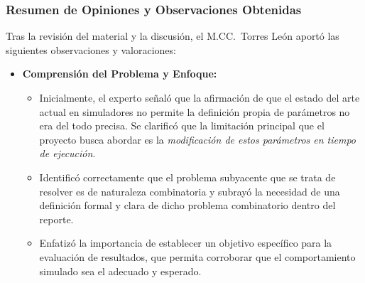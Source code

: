 \subsubsection{Resumen de Opiniones y Observaciones Obtenidas}

Tras la revisión del material y la discusión, el M.CC.\ Torres León aportó las siguientes observaciones y valoraciones:

\begin{itemize}
    \item \textbf{Comprensión del Problema y Enfoque:}
    \begin{itemize}
        \item Inicialmente, el experto señaló que la afirmación de que el estado del arte actual en simuladores no permite la definición propia de parámetros no era del todo precisa. Se clarificó que la limitación principal que el proyecto busca abordar es la \textit{modificación de estos parámetros en tiempo de ejecución}.
        \item Identificó correctamente que el problema subyacente que se trata de resolver es de naturaleza combinatoria y subrayó la necesidad de una definición formal y clara de dicho problema combinatorio dentro del reporte.
        \item Enfatizó la importancia de establecer un objetivo específico para la evaluación de resultados, que permita corroborar que el comportamiento simulado sea el adecuado y esperado.
    \end{itemize}


\end{itemize}
